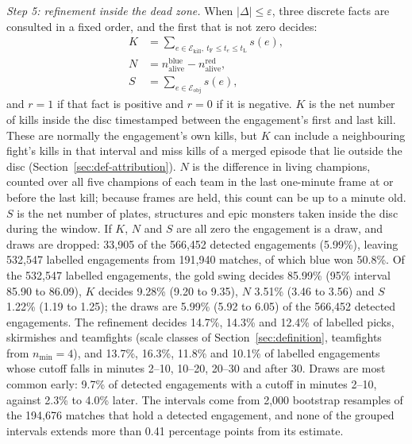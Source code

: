 \emph{Step 5: refinement inside the dead zone.} When $|\Delta| \le \varepsilon$, three discrete facts
are consulted in a fixed order, and the first that is not zero decides:
\begin{align}
K &= \textstyle\sum_{e \in \mathcal{E}_{\mathrm{kill}},\ t_{\mathrm{F}} \le t_e \le t_{\mathrm{L}}} s(e), \nonumber\\
N &= n^{\mathrm{blue}}_{\mathrm{alive}} - n^{\mathrm{red}}_{\mathrm{alive}}, \label{eq:label-refine}\\
S &= \textstyle\sum_{e \in \mathcal{E}_{\mathrm{obj}}} s(e), \nonumber
\end{align}
and $r = 1$ if that fact is positive and $r = 0$ if it is negative. $K$ is the net number of kills
inside the disc timestamped between the engagement's first and last kill. These are normally the
engagement's own kills, but $K$ can include a neighbouring fight's kills in that interval and miss
kills of a merged episode that lie outside the disc (Section~\ref{sec:def-attribution}). $N$ is the difference in
living champions, counted over all five champions of each team in the last one-minute frame at or
before the last kill; because frames are held, this count can be up to a minute old. $S$ is the net
number of plates, structures and epic monsters taken inside the disc during the window. If $K$, $N$
and $S$ are all zero the engagement is a draw, and draws are dropped: 33,905 of the 566,452 detected
engagements (5.99\%), leaving 532,547 labelled engagements from 191,940 matches, of which blue won
50.8\%. Of the 532,547 labelled engagements, the gold swing decides 85.99\% (95\% interval 85.90 to
86.09), $K$ decides 9.28\% (9.20 to 9.35), $N$ 3.51\% (3.46 to 3.56) and $S$ 1.22\% (1.19 to 1.25); the
draws are 5.99\% (5.92 to 6.05) of the 566,452 detected engagements. The refinement decides 14.7\%, 14.3\%
and 12.4\% of labelled picks, skirmishes and teamfights (scale classes of Section~\ref{sec:definition},
teamfights from $n_{\min} = 4$), and 13.7\%, 16.3\%, 11.8\% and 10.1\% of labelled engagements whose cutoff
falls in minutes 2--10, 10--20, 20--30 and after 30. Draws are most common early: 9.7\% of detected
engagements with a cutoff in minutes 2--10, against 2.3\% to 4.0\% later. The intervals come from 2,000
bootstrap resamples of the 194,676 matches that hold a detected engagement, and none of the grouped
intervals extends more than 0.41 percentage points from its estimate.
